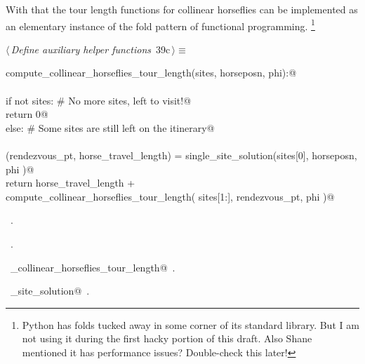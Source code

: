 \documentclass[11.5pt]{report}
\begin{document}
\vspace{-0.8cm}
With that the tour length functions for collinear horseflies can be implemented as 
an elementary instance of the fold pattern of functional programming. 
\footnote{Python has folds tucked away in some corner of its standard library. 
But I am not using it during the first hacky portion of this draft. Also Shane 
mentioned it has performance issues? Double-check this later!}
\begin{flushleft} \small\label{scrap43}\raggedright\small
{} $\langle\,${\itshape Define auxiliary helper functions}\nobreak\ {\footnotesize {39c}}$\,\rangle\equiv$
\vspace{-1ex}
\begin{list}{}{} \item
\mbox{}\verb@def compute_collinear_horseflies_tour_length(sites, horseposn, phi):@\\
\mbox{}\verb@@\\
\mbox{}\verb@     if not sites: # No more sites, left to visit!@\\
\mbox{}\verb@          return 0@\\
\mbox{}\verb@     else:         # Some sites are still left on the itinerary@\\
\mbox{}\verb@@\\
\mbox{}\verb@          (rendezvous_pt, horse_travel_length) = single_site_solution(sites[0], horseposn, phi )@\\
\mbox{}\verb@          return horse_travel_length  + \@\\
\mbox{}\verb@                 compute_collinear_horseflies_tour_length( sites[1:], rendezvous_pt, phi )@\\
\mbox{}\verb@@{\NWsep}
\end{list}
\vspace{-1.5ex}
\footnotesize
\begin{list}{}{\setlength{\itemsep}{-\parsep}\setlength{\itemindent}{-\leftmargin}}
\item \NWtxtMacroDefBy\ .
\item \NWtxtMacroRefIn\ .
\item \NWtxtIdentsDefed\nobreak\  \verb@compute_collinear_horseflies_tour_length@\nobreak\ .\item \NWtxtIdentsUsed\nobreak\  \verb@single_site_solution@\nobreak\ .
\item{}
\end{list}
\vspace{4ex}
\end{flushleft}
\end{document}
